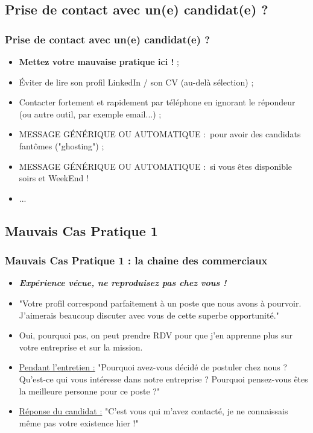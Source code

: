 \documentclass[slidetop,11pt]{beamer}
\begin{document}
\subsection{Prise de contact avec un(e) candidat(e) ?}
\begin{frame}
	\frametitle{Prise de contact avec un(e) candidat(e) ?}
	\begin{itemize}
		\item \textbf{Mettez votre mauvaise pratique ici !} ; 
		\item {\'E}viter de lire son profil LinkedIn / son CV (au-del{\`a} s{\'e}lection) ; 
		\item Contacter fortement et rapidement par t{\'e}l{\'e}phone en ignorant le r{\'e}pondeur (ou autre outil, par exemple email...) ;  
		\item MESSAGE G{\'E}N{\'E}RIQUE OU AUTOMATIQUE :~\newline pour avoir des candidats fant{\^o}mes ("ghosting") ; 
		\item MESSAGE G{\'E}N{\'E}RIQUE OU AUTOMATIQUE :~\newline si vous {\^e}tes disponible soirs et WeekEnd !
		\item ... 
	\end{itemize}
\end{frame}

\subsection{Mauvais Cas Pratique 1}
\begin{frame}
	\frametitle{Mauvais Cas Pratique 1 : la chaine des commerciaux}
	\begin{itemize}
		\item \textbf{\emph{Exp{\'e}rience v{\'e}cue, ne reproduisez pas chez vous !}}
		\item "Votre profil correspond parfaitement {\`a} un poste que nous avons {\`a} pourvoir. J'aimerais beaucoup discuter avec vous de cette superbe opportunit{\'e}."
		\item Oui, pourquoi pas, on peut prendre RDV pour que j'en apprenne plus sur votre entreprise et sur la mission.
		\item \underline{Pendant l'entretien :} "Pourquoi avez-vous d{\'e}cid{\'e} de postuler chez nous ? Qu'est-ce qui vous int{\'e}resse dans notre entreprise ? Pourquoi pensez-vous {\^e}tes la meilleure personne pour ce poste ?"
		\item \underline{R{\'e}ponse du candidat :} "C'est vous qui m'avez contact{\'e}, je ne connaissais m{\^e}me pas votre existence hier !"
	\end{itemize}
\end{frame}
\end{document}
